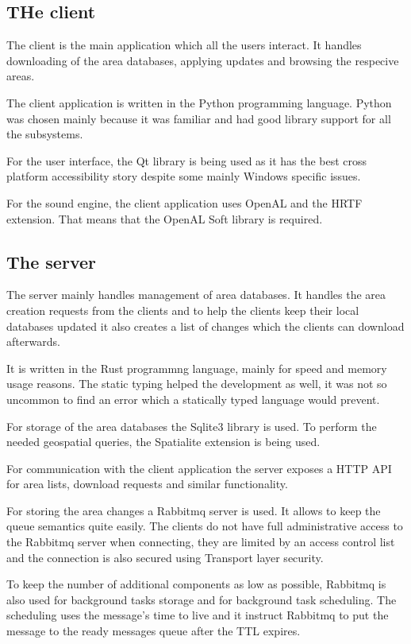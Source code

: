\documentclass[nolof,digital]{fithesis3}
\begin{document}
\subsection{THe client}
The client is the main application which all the users interact. It handles downloading of the area databases, applying updates and browsing the respecive areas.

The client application is written in the Python programming language. Python was chosen mainly because it was familiar and had good library support for all the subsystems.

For the user interface, the Qt library is being used as it has the best cross platform accessibility story despite some mainly Windows specific issues.

For the sound engine, the client application uses OpenAL and the HRTF extension. That means that the OpenAL Soft library is required.
\subsection{The server}
The server mainly handles management of area databases. It handles the area creation requests from the clients and to help the clients keep their local databases updated it also creates a list of changes which the clients can download afterwards.

It is written in the Rust programmng language, mainly for speed and memory usage reasons. The static typing helped the development as well, it was not so uncommon to find an error which a statically typed language would prevent.

For storage of the area databases the Sqlite3 library is used. To perform the needed geospatial queries, the Spatialite extension is being used.

For communication with the client application the server exposes a HTTP API for area lists, download requests and similar functionality. 

For storing the area changes a Rabbitmq server is used. It allows to keep the queue semantics quite easily. The clients do not have full administrative access to the Rabbitmq server when connecting, they are limited by an access control list and the connection is also secured using Transport layer security.

To keep the number of additional components as low as possible, Rabbitmq is also used for background tasks storage and for background task scheduling. The scheduling uses the message's time to live and it instruct Rabbitmq to put the message to the ready messages queue after the TTL expires.
\end{document}
